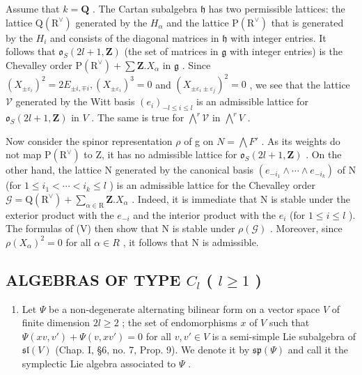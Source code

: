 Assume that \(k = \mathbf{Q}\) . The Cartan subalgebra \(\mathfrak{h}\) has two permissible lattices: the lattice \(\mathrm{Q}(\mathrm{R}^{\vee})\) generated by the \(H_{\alpha}\) and the lattice \(\mathrm{P}(\mathrm{R}^{\vee})\) that is generated by the \(H_{i}\) and consists of the diagonal matrices in \(\mathfrak{h}\) with integer entries. It follows that \(\mathfrak{o}_S(2l + 1, \mathbf{Z})\) (the set of matrices in \(\mathfrak{g}\) with integer entries) is the Chevalley order \(\mathrm{P}(\mathrm{R}^{\vee}) + \sum \mathbf{Z}.X_{\alpha}\) in \(\mathfrak{g}\) . Since \((X_{\pm \varepsilon_i})^2 = 2E_{\pm i,\mp i}, (X_{\pm \varepsilon_i})^3 = 0\) and \((X_{\pm \varepsilon_i\pm \varepsilon_j})^2 = 0\) , we see that the lattice \(\mathcal{V}\) generated by the Witt basis \((e_i)_{-l\leq i\leq l}\) is an admissible lattice for \(\mathfrak{o}_S(2l + 1,\mathbf{Z})\) in \(V\) . The same is true for \(\bigwedge^r\mathcal{V}\) in \(\bigwedge^r V\) .

Now consider the spinor representation \(\rho\) of g on \(N = \bigwedge F'\) . As its weights do not map \(\mathrm{P}(\mathrm{R}^{\vee})\) to Z, it has no admissible lattice for \(\mathfrak{o}_{S}(2l + 1, \mathbf{Z})\) . On the other hand, the lattice N generated by the canonical basis \((e_{-i_{1}} \wedge \cdots \wedge e_{-i_{k}})\) of N (for \(1 \leq i_{1} < \cdots < i_{k} \leq l\) ) is an admissible lattice for the Chevalley order \(\mathcal{G} = \mathrm{Q}(\mathrm{R}^{\vee}) + \sum_{\alpha \in \mathrm{R}} \mathbf{Z}. X_{\alpha}\) . Indeed, it is immediate that N is stable under the exterior product with the \(e_{-i}\) and the interior product with the \(e_{i}\) (for \(1 \leq i \leq l\) ). The formulas of (V) then show that N is stable under \(\rho(\mathcal{G})\) . Moreover, since \(\rho(X_{\alpha})^{2} = 0\) for all \(\alpha \in R\) , it follows that N is admissible.

\subsection{\texorpdfstring{ALGEBRAS OF TYPE \(C_{l}\) ( \(l \geq 1\) )}{ALGEBRAS OF TYPE C\_\{l\} ( l \textbackslash geq 1 )}}

\begin{enumerate}
\def\labelenumi{(\Roman{enumi})}
\tightlist
\item
  Let \(\varPsi\) be a non-degenerate alternating bilinear form on a vector space \(V\) of finite dimension \(2l \geq 2\) ; the set of endomorphisms \(x\) of \(V\) such that \(\varPsi(xv, v') + \varPsi(v, xv') = 0\) for all \(v, v' \in V\) is a semi-simple Lie subalgebra of \(\mathfrak{sl}(V)\) (Chap. I, §6, no. 7, Prop. 9). We denote it by \(\mathfrak{sp}(\varPsi)\) and call it the symplectic Lie algebra associated to \(\varPsi\) .
\end{enumerate}

